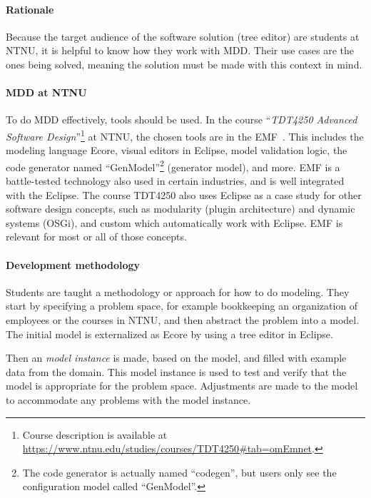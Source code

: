\paragraph{Rationale}
Because the target audience of the software solution (tree editor) are students at \acrshort{NTNU}, it is helpful to know how they work with \acrlong{MDD}.
Their use cases are the ones being solved, meaning the solution must be made with this context in mind.

\paragraph{\Acrshort{MDD} at \acrshort{NTNU}}
To do \acrlong{MDD} effectively, tools should be used.
In the course ``\textit{\gls{TDT4250} Advanced Software Design}''\footnote{Course description is available at \href{https://www.ntnu.edu/studies/courses/TDT4250\#tab=omEmnet}{https://www.ntnu.edu/studies/courses/TDT4250\#tab=omEmnet}.} at \acrshort{NTNU}, the chosen tools are in the \acrfull{EMF}~\cite{hallvardtraettebergEMFTDT4250NTNU2017}.
This includes the modeling language \gls{Ecore}, visual editors in \gls{Eclipse}, model validation logic, the code generator named ``GenModel''\footnote{The code generator is actually named ``codegen'', but users only see the configuration model called ``GenModel''.} (generator model), and more.
\Acrshort{EMF} is a battle-tested technology also used in certain industries, and is well integrated with the \gls{Eclipse}.
The course \gls{TDT4250} also uses \gls{Eclipse} as a case study for other software design concepts, such as modularity (plugin architecture) and dynamic systems (OSGi), and custom  which automatically work with \gls{Eclipse}.
\Acrshort{EMF} is relevant for most or all of those concepts.

\paragraph{Development methodology}
Students are taught a methodology or approach for how to do modeling.
They start by specifying a problem space, for example bookkeeping an organization of employees or the courses in \acrshort{NTNU}, and then abstract the problem into a model.
The initial model is externalized as \gls{Ecore} by using a tree editor in \gls{Eclipse}.


Then an \textit{model instance} is made, based on the model, and filled with example data from the domain.
This model instance is used to test and verify that the model is appropriate for the problem space.
Adjustments are made to the model to accommodate any problems with the model instance.


